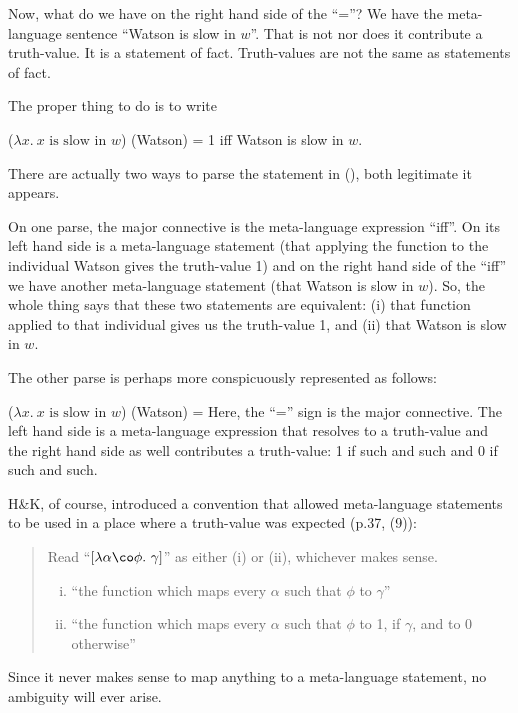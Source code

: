 Now, what do we have on the right hand side of the ``=''? We have the
meta-language sentence ``Watson is slow in $w$''. That is not nor does it
contribute a truth-value. It is a statement of fact. Truth-values are not the
same as statements of fact.

\kwn The proper thing to do is to write

\ex ($\lambda x.\ x \mbox{ is slow in } w$) (Watson) = 1 iff Watson
is slow in $w$.\label{ex:goodwatson} \xe

There are actually two ways to parse the statement in (\lastx), both legitimate
it appears.

On one parse, the major connective is the meta-language expression ``iff''. On
its left hand side is a meta-language statement (that applying the function to
the individual Watson gives the truth-value 1) and on the right hand side of the
``iff'' we have another meta-language statement (that Watson is slow in $w$).
So, the whole thing says that these two statements are equivalent: (i) that
function applied to that individual gives us the truth-value 1, and (ii) that
Watson is slow in $w$.

%
The other parse is perhaps more conspicuously represented as follows:

\ex ($\lambda x.\ x \mbox{ is slow in } w$) (Watson) =  \xe
%
Here, the ``='' sign is the major connective. The left hand side is a
meta-language expression that resolves to a truth-value and the right hand side
as well contributes a truth-value: 1 if such and such and 0 if such and such.

H\&K, of course, introduced a convention that allowed meta-language
statements to be used in a place where a truth-value was expected (p.37, (9)):

\begin{quote}
  Read ``$[\lambda \alpha\co \phi.\ \gamma]$'' as either (i) or (ii),
  whichever makes sense.
  \begin{enumerate}[(i)]
  \item ``the function which maps every $\alpha$ such that $\phi$ to
    $\gamma$''
  \item ``the function which maps every $\alpha$ such that $\phi$ to
    1, if $\gamma$, and to 0 otherwise''
  \end{enumerate}
\end{quote}
%
Since it never makes sense to map anything to a meta-language statement, no
ambiguity will ever arise.

